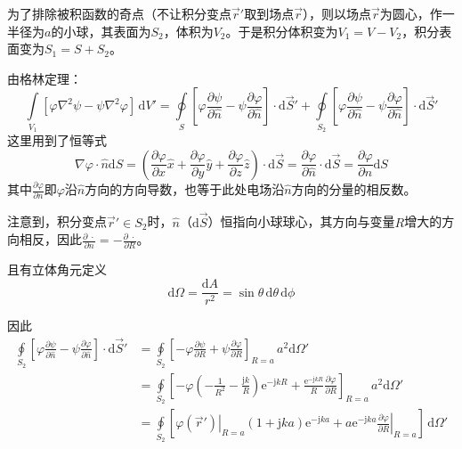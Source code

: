     为了排除被积函数的奇点（不让积分变点$\vec{ r}'$取到场点$\vec{r}$），则以场点$\vec{r}$为圆心，作一半径为$a$的小球，其表面为$S_2$，体积为$V_2$。于是积分体积变为$V_1=V-V_2$，积分表面变为$S_1=S+S_2$。

    由格林定理：
    \begin{equation}\label{Equ: 方程求解滞后势}
        \int\limits_{V_1}\left[\varphi \nabla^2\psi-\psi \nabla^2 \varphi\right]\,\mathrm{d}V'
        =\oint\limits_{S} \left[\varphi \frac{\partial \psi}{\partial \hat{n}}-\psi \frac{\partial \varphi}{\partial \hat{n}}\right]\cdot\mathrm{d}\vec{S}'
        +\oint\limits_{S_2} \left[\varphi \frac{\partial \psi}{\partial \hat{n}}-\psi \frac{\partial \varphi}{\partial \hat{n}}\right]\cdot\mathrm{d}\vec{S}'
    \end{equation}
    这里用到了恒等式
    \begin{equation*}
        \nabla \varphi \cdot \hat{n}\mathrm{d}S
        =\left(\frac{\partial \varphi}{\partial x}\hat{x}+\frac{\partial \varphi}{\partial y}\hat{y}+\frac{\partial \varphi}{\partial z}\hat{z}\right)\cdot \mathrm{d}\vec{S}
        =\frac{\partial \varphi}{\partial \hat{n}}\cdot \mathrm{d}\vec{S}
        =\frac{\partial \varphi}{\partial n}\mathrm{d}S
    \end{equation*}
    其中$\frac{\partial \varphi}{\partial n}$即$\varphi$沿$\hat{n}$方向的方向导数，也等于此处电场沿$\hat{n}$方向的分量的相反数。

    注意到，积分变点$\vec{r}'\in S_2$时，$\hat{n}$（$\mathrm{d}\vec{S}$）恒指向小球球心，其方向与变量$R$增大的方向相反，因此$\frac{\partial \;\cdot }{\partial n}=-\frac{\partial \;\cdot}{\partial R}$。
    
    且有立体角元定义
    \begin{equation}
        \mathrm{d}\varOmega=\frac{\mathrm{d}A}{r^2}=\sin\theta \,\mathrm{d}\theta \,\mathrm{d}\phi
    \end{equation}
    
    因此
    \begin{equation*}
        \begin{aligned}
            \oint\limits_{S_2} \left[\varphi \frac{\partial \psi}{\partial \hat{n}}-\psi \frac{\partial \varphi}{\partial \hat{n}}\right]\cdot\mathrm{d}\vec{S}'
            &=\oint\limits_{S_2} \left[-\varphi \frac{\partial \psi}{\partial R}+\psi \frac{\partial \varphi}{\partial R}\right]_{R=a} \,a^2\mathrm{d}\varOmega'\\
            &=\oint\limits_{S_2} \left[-\varphi \left(-\frac{1}{R^2}-\frac{\mathrm{j}k}{R}\right)\mathrm{e}^{-\mathrm{j}k R}+ \frac{\mathrm{e}^{-\mathrm{j}kR}}{R} \frac{\partial \varphi}{\partial R}\right]_{R=a} \,a^2\mathrm{d}\varOmega'\\
            &=\oint\limits_{S_2} \left[\left.\varphi(\vec{r}')\right\vert_{R=a} \left(1+\mathrm{j}ka\right)\mathrm{e}^{-\mathrm{j}ka}+ a\mathrm{e}^{-\mathrm{j}ka}\left.\frac{\partial \varphi}{\partial R}\right\vert_{R=a}\right] \,\mathrm{d}\varOmega'
        \end{aligned}
    \end{equation*}

